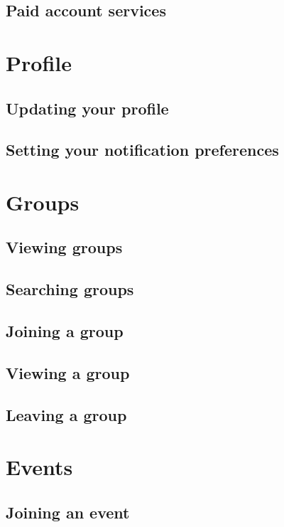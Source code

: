 \documentclass[a4paper,11pt,titlepage]{scrartcl}
\begin{document}
\subsection{Paid account services}

\clearpage
\section{Profile}

\subsection{Updating your profile}

\subsection{Setting your notification preferences}

\clearpage
\section{Groups}

\subsection{Viewing groups}

\subsection{Searching groups}

\subsection{Joining a group}

\subsection{Viewing a group}

\subsection{Leaving a group}

\clearpage
\section{Events}

\subsection{Joining an event}
\end{document}
